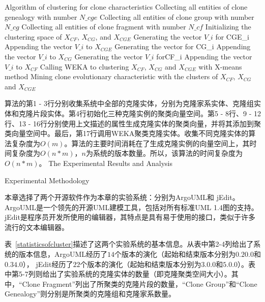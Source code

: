 \vspace{1em}
\begin{minipage}{0.9\textwidth}
\centering
\begin{algorithm}[H]
 {Algorithm of clustering for clone characteristics}
\label{alg-characteristic}
Collecting all entities of clone genealogy with number {$N\_cge$}\;
Collecting all entities of clone group with number{$N\_cg$}\;
Collecting all entities of clone fragment with number {$N\_cf$}\; 
Initializing the clustering space of  $X_{CF}$, $X_{CG}$, and $X_{CGE}$\;
{
 Generating the vector {$V\_i$} for {CGE\_i}\;
 Appending the vector {$V\_i$} to $X_{CGE}$\;
 }
{ 
 Generating the vector for {CG\_i}\;
 Appending the vector {$V\_i$} to $X_{CG}$\;
}
{ 
 Generating the vector {$V\_i$} for{CF\_i}\;
 Appending the vector {$V\_i$} to $X_{CF}$\;
}
Calling WEKA to clustering $X_{CF}$, $X_{CG}$ and  $X_{CGE}$ with X-means method\;
Mining clone evolutionary characteristic with the clusters of $X_{CF}$, $X_{CG}$ and  $X_{CGE}$\;
\end{algorithm}
\end{minipage}
\vspace{1em}

算法的第1 - 3行分别收集系统中全部的克隆实体，分别为克隆家系实体、克隆组实体和克隆片段实体。第4行初始化三种克隆实例的聚类向量空间。第5 - 8行、9 - 12行、13 - 16行分别使用上文描述的属性生成克隆实体的聚类向量，并将其添加到聚类向量空间中。最后，第17行调用WEKA聚类克隆实体。收集不同克隆实体的算法复杂度为$O(m)$。算法的主要时间消耗在了生成克隆实例的向量空间上，其时间复杂度为$O(n*m)$，$n$为系统的版本数量。所以，该算法的时间复杂度为$O(n*m)$。
{The Experimental Results and Analysis}
\label{ref-characteristics}

{Experimental Methodology}

本章选择了两个开源软件作为本章的实验系统：分别为ArgoUML和 jEdit。ArgoUML是一个领先的开源UML建模工具，包括对所有标准UML 1.4图的支持。jEdit是程序员开发所使用的编辑器，其特点是具有易于使用的接口，类似于许多流行的文本编辑器。

表~\ref{statisticsofcluster}描述了这两个实验系统的基本信息。从表中第2-4列给出了系统的版本信息，ArgoUML经历了$14 $个版本的演化（起始和结束版本分别为$0.20.0$和$0.34.0$）， jEdit经历了$22$个版本的演化（起始和结束版本分别为$3.0.0$和$5.0.0$）。表中第5-7列则给出了实验系统的克隆实体的数量（即克隆聚类空间大小）。其中，“Clone Fragment”列出了所聚类的克隆片段的数量，“Clone Group”和“Clone Genealogy”则分别是所聚类的克隆组和克隆家系数量。

